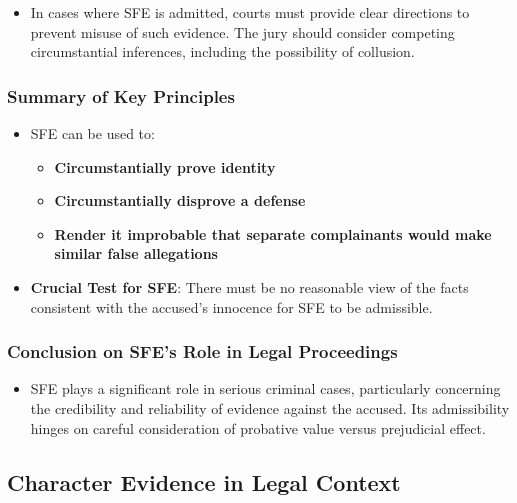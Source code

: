 \begin{itemize}
\tightlist
\item
  In cases where SFE is admitted, courts must provide clear directions
  to prevent misuse of such evidence. The jury should consider competing
  circumstantial inferences, including the possibility of collusion.
\end{itemize}

\subsubsection{Summary of Key
Principles}\label{summary-of-key-principles}

\begin{itemize}
\tightlist
\item
  SFE can be used to:

  \begin{itemize}
  \tightlist
  \item
    \textbf{Circumstantially prove identity}
  \item
    \textbf{Circumstantially disprove a defense}
  \item
    \textbf{Render it improbable that separate complainants would make
    similar false allegations}
  \end{itemize}
\item
  \textbf{Crucial Test for SFE}: There must be no reasonable view of the
  facts consistent with the accused's innocence for SFE to be
  admissible.
\end{itemize}

\subsubsection{Conclusion on SFE's Role in Legal
Proceedings}\label{conclusion-on-sfes-role-in-legal-proceedings}

\begin{itemize}
\tightlist
\item
  SFE plays a significant role in serious criminal cases, particularly
  concerning the credibility and reliability of evidence against the
  accused. Its admissibility hinges on careful consideration of
  probative value versus prejudicial effect.
\end{itemize}

\subsection{  Character Evidence in Legal
Context}\label{character-evidence-in-legal-context}

